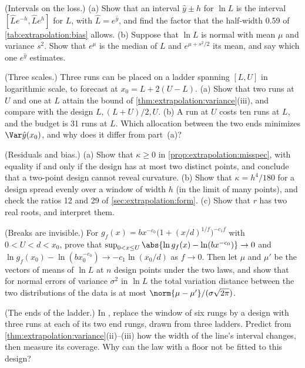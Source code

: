 \begin{refsection}
\begin{exercises}
\item \consolidation (Intervals on the loss.) (a) Show that an interval $\hat y\pm h$ for $\ln L$ is the interval $[\hat Le^{-h},\hat Le^{h}]$ for $L$, with $\hat L=e^{\hat y}$, and find the factor that the half-width 0.59 of \cref{tab:extrapolation:bias} allows. (b) Suppose that $\ln L$ is normal with mean $\mu$ and variance $s^2$. Show that $e^{\mu}$ is the median of $L$ and $e^{\mu+s^2/2}$ its mean, and say which one $e^{\hat y}$ estimates.\label{ex:extrapolation:loglog}

\item \consolidation (Three scales.) Three runs can be placed on a ladder spanning $[L,U]$ in logarithmic scale, to forecast at $x_0=L+2(U-L)$. (a) Show that two runs at $U$ and one at $L$ attain the bound of \cref{thm:extrapolation:variance}(iii), and compare with the design $L,(L+U)/2,U$. (b) A run at $U$ costs ten runs at $L$, and the budget is 31 runs at $L$. Which allocation between the two ends minimizes $\Var\hat y(x_0)$, and why does it differ from part~(a)?\label{ex:extrapolation:three}

\item \consolidation (Residuals and bias.) (a) Show that $\kappa\ge0$ in \cref{prop:extrapolation:misspec}, with equality if and only if the design has at most two distinct points, and conclude that a two-point design cannot reveal curvature. (b) Show that $\kappa=h^4/180$ for a design spread evenly over a window of width $h$ (in the limit of many points), and check the ratios 12 and 29 of \cref{sec:extrapolation:form}. (c) Show that $r$ has two real roots, and interpret them.\label{ex:extrapolation:residual}

\item \consolidation\hard (Breaks are invisible.) For $g_f(x)=bx^{-c_0}\bigl(1+(x/d)^{1/f}\bigr)^{-c_1f}$ with $0<U<d<x_0$, prove that $\sup_{0<x\le U}\abs{\ln g_f(x)-\ln(bx^{-c_0})}\to0$ and $\ln g_f(x_0)-\ln(bx_0^{-c_0})\to-c_1\ln(x_0/d)$ as $f\to0$. Then let $\mu$ and $\mu'$ be the vectors of means of $\ln L$ at $n$ design points under the two laws, and show that for normal errors of variance $\sigma^2$ in $\ln L$ the total variation distance between the two distributions of the data is at most $\norm{\mu-\mu'}/(\sigma\sqrt{2\pi})$. \label{ex:extrapolation:break}

\item \labwork (The ends of the ladder.) In , replace the window of six rungs by a design with three runs at each of its two end rungs, drawn from three ladders. Predict from \cref{thm:extrapolation:variance}(ii)--(iii) how the width of the line's interval changes, then measure its coverage. Why can the law with a floor not be fitted to this design?\label{ex:extrapolation:ends}


\end{exercises}
\end{refsection}
